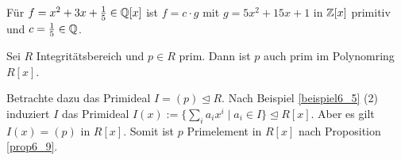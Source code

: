 \begin{beispiel}\label{beispiel6_21}
	Für $f = x^2 + 3x + \frac{1}{5} \in \mathbb{Q}[x]$ ist $f = c\cdot g$ mit $g = 5x^2 + 15 x + 1$ in $\mathbb{Z}[x]$ primitiv und $c = \frac{1}{5} \in \mathbb{Q}$.
\end{beispiel}
\begin{rem}\label{rem6_22}
	Sei $R$ Integritätsbereich und $p \in R$ prim. Dann ist $p$ auch prim im Polynomring $R[x]$.
	\begin{inlproof}
		Betrachte dazu das Primideal $I = (p) \unlhd R$. Nach Beispiel \ref{beispiel6_5} (2) induziert $I$ das Primideal $I(x) := \{\sum_i a_i x^i \mid a_i \in I\} \unlhd R[x]$. Aber es gilt $I(x) = (p)$ in $R[x]$. Somit ist $p$ Primelement in $R[x]$ nach Proposition \ref{prop6_9}.
	\end{inlproof}
\end{rem}

